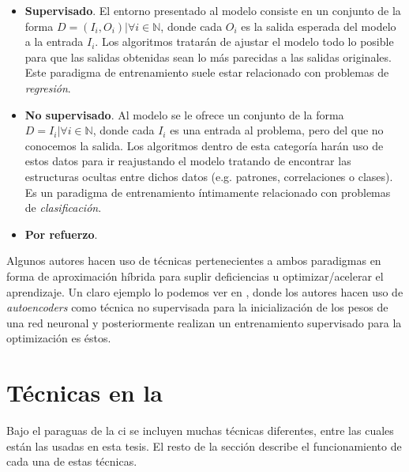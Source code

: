 \begin{itemize}
	\item \textbf{Supervisado}. El entorno presentado al modelo consiste en un conjunto de la forma $D = {(I_i, O_i) | \forall i \in \mathbb{N}}$, donde cada $O_i$ es la salida esperada del modelo a la entrada $I_i$. Los algoritmos tratarán de ajustar el modelo todo lo posible para que las salidas obtenidas sean lo más parecidas a las salidas originales. Este paradigma de entrenamiento suele estar relacionado con problemas de \textit{regresión}.
	\item \textbf{No supervisado}. Al modelo se le ofrece un conjunto de la forma $D = {I_i | \forall i \in \mathbb{N}}$, donde cada $I_i$ es una entrada al problema, pero del que no conocemos la salida. Los algoritmos dentro de esta categoría harán uso de estos datos para ir reajustando el modelo tratando de encontrar las estructuras ocultas entre dichos datos (e.g. patrones, correlaciones o clases). Es un paradigma de entrenamiento íntimamente relacionado con problemas de \textit{clasificación}.
	\item \textbf{Por refuerzo}. 
\end{itemize}

Algunos autores hacen uso de técnicas pertenecientes a ambos paradigmas en forma de aproximación híbrida para suplir deficiencias u optimizar/acelerar el aprendizaje. Un claro ejemplo lo podemos ver en \cite{Hinton2006}, donde los autores hacen uso de \textit{autoencoders} como técnica no supervisada para la inicialización de los pesos de una red neuronal y posteriormente realizan un entrenamiento supervisado para la optimización es éstos.

\section{Técnicas en la }

Bajo el paraguas de la \ac{ci} se incluyen muchas técnicas diferentes, entre las cuales están las usadas en esta tesis. El resto de la sección describe el funcionamiento de cada una de estas técnicas.

\subsection{}

